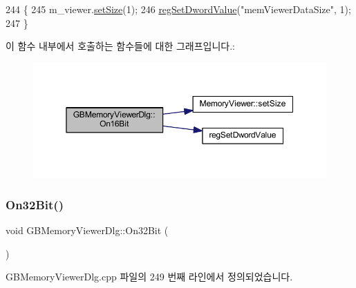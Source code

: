 \begin{DoxyCode}
244 \{
245   m\_viewer.\mbox{\hyperlink{class_memory_viewer_a185cb06e604ff1e0016b9be859c21387}{setSize}}(1);
246   \mbox{\hyperlink{_reg_8cpp_a758e775489a3fb5c3cc7071fdd5af87e}{regSetDwordValue}}(\textcolor{stringliteral}{"memViewerDataSize"}, 1);
247 \}
\end{DoxyCode}
이 함수 내부에서 호출하는 함수들에 대한 그래프입니다.\+:
\nopagebreak
\begin{figure}[H]
\begin{center}
\leavevmode
\includegraphics[width=350pt]{class_g_b_memory_viewer_dlg_a52b3f9fedab4314bd634becf88c756a2_cgraph}
\end{center}
\end{figure}
\mbox{\label{class_g_b_memory_viewer_dlg_a4e97f32250cfe77d1381fb21eed6daa4}} 
\subsubsection{\texorpdfstring{On32\+Bit()}{On32Bit()}}
{\footnotesize\ttfamily void G\+B\+Memory\+Viewer\+Dlg\+::\+On32\+Bit (\begin{DoxyParamCaption}{ }\end{DoxyParamCaption})\hspace{0.3cm}{\ttfamily [protected]}}



G\+B\+Memory\+Viewer\+Dlg.\+cpp 파일의 249 번째 라인에서 정의되었습니다.


